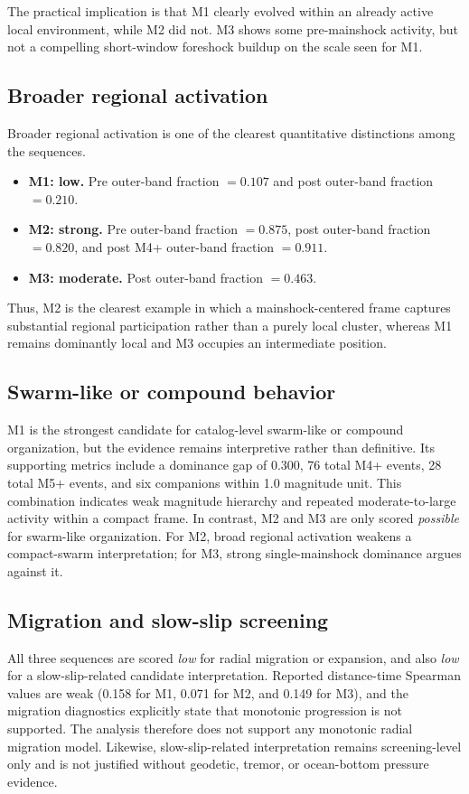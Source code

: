 \documentclass[11pt]{article}
\begin{document}
The practical implication is that M1 clearly evolved within an already active local environment, while M2 did not. M3 shows some pre-mainshock activity, but not a compelling short-window foreshock buildup on the scale seen for M1.

\subsection{Broader regional activation}
Broader regional activation is one of the clearest quantitative distinctions among the sequences.
\begin{itemize}[leftmargin=1.5em]
    \item \textbf{M1: low.} Pre outer-band fraction $=0.107$ and post outer-band fraction $=0.210$.
    \item \textbf{M2: strong.} Pre outer-band fraction $=0.875$, post outer-band fraction $=0.820$, and post M4+ outer-band fraction $=0.911$.
    \item \textbf{M3: moderate.} Post outer-band fraction $=0.463$.
\end{itemize}
Thus, M2 is the clearest example in which a mainshock-centered frame captures substantial regional participation rather than a purely local cluster, whereas M1 remains dominantly local and M3 occupies an intermediate position.

\subsection{Swarm-like or compound behavior}
M1 is the strongest candidate for catalog-level swarm-like or compound organization, but the evidence remains interpretive rather than definitive. Its supporting metrics include a dominance gap of 0.300, 76 total M4+ events, 28 total M5+ events, and six companions within 1.0 magnitude unit. This combination indicates weak magnitude hierarchy and repeated moderate-to-large activity within a compact frame. In contrast, M2 and M3 are only scored \emph{possible} for swarm-like organization. For M2, broad regional activation weakens a compact-swarm interpretation; for M3, strong single-mainshock dominance argues against it.

\subsection{Migration and slow-slip screening}
All three sequences are scored \emph{low} for radial migration or expansion, and also \emph{low} for a slow-slip-related candidate interpretation. Reported distance-time Spearman values are weak (0.158 for M1, 0.071 for M2, and 0.149 for M3), and the migration diagnostics explicitly state that monotonic progression is not supported. The analysis therefore does not support any monotonic radial migration model. Likewise, slow-slip-related interpretation remains screening-level only and is not justified without geodetic, tremor, or ocean-bottom pressure evidence.
\end{document}
